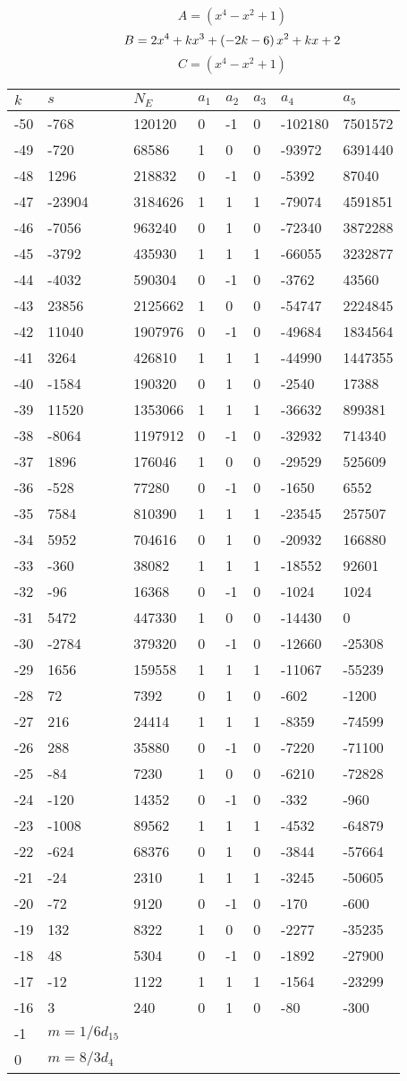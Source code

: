 \documentclass{amsart}
\begin{document}
$$A=(x^4
 - x^2
 + 1)$$
$$B=2\*x^4
 + k\*x^3
 + \left(-2\*k
 - 6\right) \*x^2
 + k\*x
 + 2$$
$$C=(x^4
 - x^2
 + 1)$$
\begin{longtable}{|l|l|l|lllll|}
\hline
$k$ & $s$ & $N_E$ & $a_1$ & $a_2$ & $a_3$ & $a_4$ & $a_5$\\
\hline
-50&-768&120120&0&-1&0&-102180&7501572\\
-49&-720&68586&1&0&0&-93972&6391440\\
-48&1296&218832&0&-1&0&-5392&87040\\
-47&-23904&3184626&1&1&1&-79074&4591851\\
-46&-7056&963240&0&1&0&-72340&3872288\\
-45&-3792&435930&1&1&1&-66055&3232877\\
-44&-4032&590304&0&-1&0&-3762&43560\\
-43&23856&2125662&1&0&0&-54747&2224845\\
-42&11040&1907976&0&-1&0&-49684&1834564\\
-41&3264&426810&1&1&1&-44990&1447355\\
-40&-1584&190320&0&1&0&-2540&17388\\
-39&11520&1353066&1&1&1&-36632&899381\\
-38&-8064&1197912&0&-1&0&-32932&714340\\
-37&1896&176046&1&0&0&-29529&525609\\
-36&-528&77280&0&-1&0&-1650&6552\\
-35&7584&810390&1&1&1&-23545&257507\\
-34&5952&704616&0&1&0&-20932&166880\\
-33&-360&38082&1&1&1&-18552&92601\\
-32&-96&16368&0&-1&0&-1024&1024\\
-31&5472&447330&1&0&0&-14430&0\\
-30&-2784&379320&0&-1&0&-12660&-25308\\
-29&1656&159558&1&1&1&-11067&-55239\\
-28&72&7392&0&1&0&-602&-1200\\
-27&216&24414&1&1&1&-8359&-74599\\
-26&288&35880&0&-1&0&-7220&-71100\\
-25&-84&7230&1&0&0&-6210&-72828\\
-24&-120&14352&0&-1&0&-332&-960\\
-23&-1008&89562&1&1&1&-4532&-64879\\
-22&-624&68376&0&1&0&-3844&-57664\\
-21&-24&2310&1&1&1&-3245&-50605\\
-20&-72&9120&0&-1&0&-170&-600\\
-19&132&8322&1&0&0&-2277&-35235\\
-18&48&5304&0&-1&0&-1892&-27900\\
-17&-12&1122&1&1&1&-1564&-23299\\
-16&3&240&0&1&0&-80&-300\\
-1&$m=1/6d_{15}$&&\multicolumn{5}{c|}{}\\
0&$m=8/3d_{4}$&&\multicolumn{5}{c|}{}\\
\hline
\end{longtable}
\end{document}
